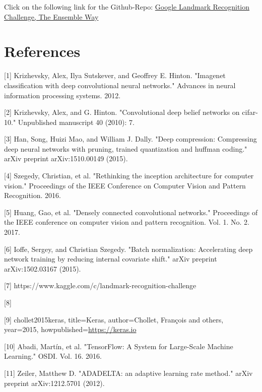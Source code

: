 \documentclass{article}
\begin{document}
Click on the following link for the Github-Repo: 
\href{https://github.com/parya-j/team-rope}{Google Landmark Recognition Challenge, The Ensemble Way}
\section*{References}


[1] Krizhevsky, Alex, Ilya Sutskever, and Geoffrey E. Hinton. "Imagenet classification with deep convolutional neural networks." Advances in neural information processing systems. 2012.

[2] Krizhevsky, Alex, and G. Hinton. "Convolutional deep belief networks on cifar-10." Unpublished manuscript 40 (2010): 7.

[3] Han, Song, Huizi Mao, and William J. Dally. "Deep compression: Compressing deep neural networks with pruning, trained quantization and huffman coding." arXiv preprint arXiv:1510.00149 (2015).

[4] Szegedy, Christian, et al. "Rethinking the inception architecture for computer vision." Proceedings of the IEEE Conference on Computer Vision and Pattern Recognition. 2016.

[5] Huang, Gao, et al. "Densely connected convolutional networks." Proceedings of the IEEE conference on computer vision and pattern recognition. Vol. 1. No. 2. 2017.

[6] Ioffe, Sergey, and Christian Szegedy. "Batch normalization: Accelerating deep network training by reducing internal covariate shift." arXiv preprint arXiv:1502.03167 (2015).

[7] https://www.kaggle.com/c/landmark-recognition-challenge

[8] 

[9] chollet2015keras,
title={Keras},
author={Chollet, Fran\c{c}ois and others},
year={2015},
howpublished={\url{https://keras.io}}

[10] Abadi, Martín, et al. "TensorFlow: A System for Large-Scale Machine Learning." OSDI. Vol. 16. 2016.

[11] Zeiler, Matthew D. "ADADELTA: an adaptive learning rate method." arXiv preprint arXiv:1212.5701 (2012).
\end{document}
